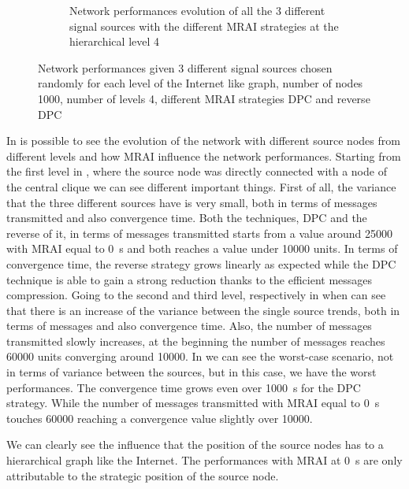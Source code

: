 \begin{figure}[h]
\begin{subfigure}[b]{0.45\textwidth}
		 \caption{Network performances evolution of all the \num{3} different signal sources 
			with the different \ac{MRAI} strategies at the hierarchical level \num{4}}
         \label{fig:different_levels_4}
     \end{subfigure}
     \hfill
	 \caption{Network performances given \num{3} different signal sources chosen
		randomly for each level of the Internet like graph, number of nodes 
		\num{1000}, number of levels \num{4}, different \ac{MRAI} strategies
		\ac{DPC} and reverse \ac{DPC} }
	 \label{fig:different_levels}
\end{figure}

In  is possible to see the evolution of the network
with different source nodes from different levels and how \ac{MRAI} influence
the network performances.
Starting from the first level in , where the source
node was directly connected with a node of the central clique we can see different
important things.
First of all, the variance that the three different sources have is very small, 
both in terms of messages transmitted and also convergence time.
Both the techniques, \ac{DPC} and the reverse of it, in terms of messages
transmitted starts from a value around \num{25000} with \ac{MRAI} equal to 
\SI{0}{\second} and both reaches a value under \num{10000} units.
In terms of convergence time, the reverse strategy grows linearly as expected
while the \ac{DPC} technique is able to gain a strong reduction thanks to
the efficient messages compression.
Going to the second and third level, respectively in 
 when can see that there
is an increase of the variance between the single source trends, both in terms
of messages and also convergence time.
Also, the number of messages transmitted slowly increases, at the beginning the 
number of messages reaches \num{60000} units converging around \num{10000}.
In  we can see the worst-case scenario, not in 
terms of variance between the sources, but in this case, we have the worst
performances.
The convergence time grows even over \SI{1000}{\second} for the \ac{DPC} strategy.
While the number of messages transmitted with \ac{MRAI} equal to \SI{0}{\second}
touches \num{60000} reaching a convergence value slightly over \num{10000}.

We can clearly see the influence that the position of the source nodes has to
a hierarchical graph like the Internet.
The performances with \ac{MRAI} at \SI{0}{\second} are only attributable to the
strategic position of the source node.


